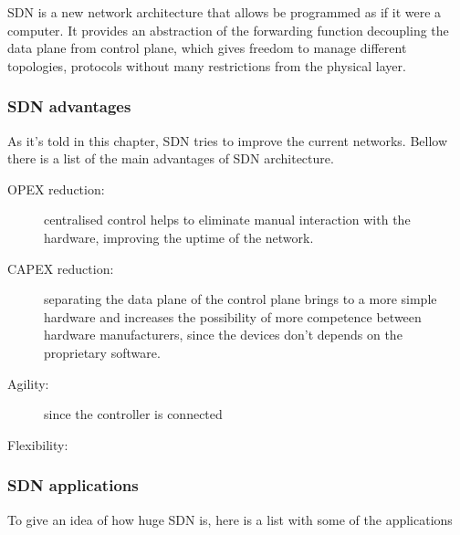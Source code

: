SDN is a new network architecture that allows be programmed as if it were a computer. It provides an abstraction of the forwarding function decoupling the data plane from control plane, which gives freedom to manage different topologies, protocols without many restrictions from the physical layer.


\subsubsection{SDN advantages} 

As it's told in this chapter, SDN tries to improve the current networks. Bellow there is a list of the main advantages of SDN architecture.

\begin{description}
\item[OPEX reduction:] centralised control helps to eliminate manual interaction with the hardware, improving the uptime of the network. 
\item[CAPEX reduction:] separating the data plane of the control plane brings to a more simple hardware and increases the possibility of more competence between hardware manufacturers, since the devices don't depends on the proprietary software.
\item[Agility:] since the controller is connected
\item[Flexibility:]
\end{description}



\subsubsection{SDN applications}

To give an idea of how huge SDN is, here is a list with some of the applications 

